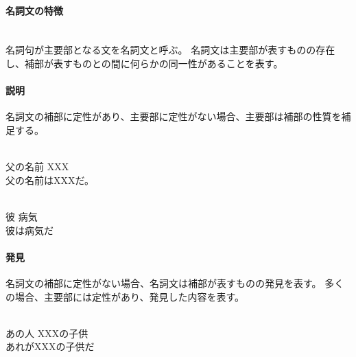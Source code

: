 \paragraph{名詞文の特徴}\quad\\
名詞句が主要部となる文を名詞文と呼ぶ。
名詞文は主要部が表すものの存在し、補部が表すものとの間に何らかの同一性があることを表す。

\paragraph{説明}
名詞文の補部に定性があり、主要部に定性がない場合、主要部は補部の性質を補足する。

\begin{exe}
    \ex \gll [u\'ak\'a ap\'a piku\'o] [XXX] \\
        父の名前 XXX \\
    \glt 父の名前はXXXだ。
\end{exe}
\begin{exe}
    \ex \gll [k\'ap\'a] [k\'um\'am\textipa{E}] \\
        彼 病気 \\
    \glt 彼は病気だ
\end{exe}

\paragraph{発見}
名詞文の補部に定性がない場合、名詞文は補部が表すものの発見を表す。
多くの場合、主要部には定性があり、発見した内容を表す。

\begin{exe}
    \ex {} \\
        あの人 XXXの子供 \\
    \glt あれがXXXの子供だ
\end{exe}